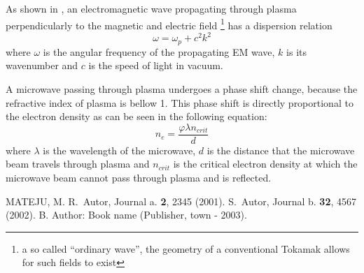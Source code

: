 \documentclass[twoside]{articlek}
\begin{document}
As shown in \cite{mateju}, an electromagnetic wave propagating through plasma perpendicularly to the magnetic and electric field \footnote{a so called ``ordinary wave'', the geometry of a conventional Tokamak allows for such fields to exist} has a dispersion relation
\begin{equation}
    \omega = \omega_p +c^2 k^2
    \label{eq:dispersion}
\end{equation}
where $\omega$ is the angular frequency of the propagating EM wave, $k$ is its wavenumber and $c$ is the speed of light in vacuum.


A microwave passing through plasma undergoes a phase shift change, because the refractive index of plasma is bellow 1. %
This phase shift is directly proportional to the electron density as can be seen in the following equation:
\begin{equation}
    n_e=\frac{\varphi \lambda n_{crit}}{d}
    \label{eq:ne}
\end{equation}
where $\lambda$ is the wavelength of the microwave, $d$ is the distance that the microwave beam travels through plasma and $n_{crit}$ is the critical electron density at which the microwave beam cannot pass through plasma and is reflected.
\begin{thebibliography}{99}

\leftskip=-5pt \vspace{-0.3truecm}
 MATEJU, M.
 R.~Autor, Journal a. {\bf 2}, 2345 (2001).
 S.~Autor, Journal b. {\bf 32}, 4567 (2002).
 B. Author: Book name (Publisher, town - 2003).
\end{thebibliography}
\end{document}
